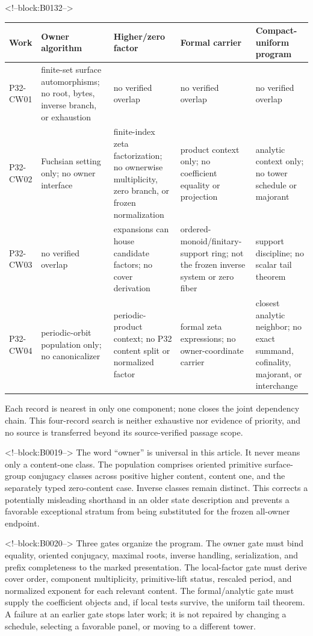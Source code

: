\documentclass[11pt]{article}
\begin{document}
<!--block:B0132-->
\begin{center}
\scriptsize
\begin{tabular}{@{}p{.11\linewidth}p{.19\linewidth}p{.19\linewidth}p{.19\linewidth}p{.19\linewidth}@{}}
\toprule
Work & Owner algorithm & Higher/zero factor & Formal carrier & Compact-uniform program \\
\midrule
P32-CW01 & finite-set surface automorphisms; no root, bytes, inverse branch, or exhaustion & no verified overlap & no verified overlap & no verified overlap \\
P32-CW02 & Fuchsian setting only; no owner interface & finite-index zeta factorization; no ownerwise multiplicity, zero branch, or frozen normalization & product context only; no coefficient equality or projection & analytic context only; no tower schedule or majorant \\
P32-CW03 & no verified overlap & expansions can house candidate factors; no cover derivation & ordered-monoid/finitary-support ring; not the frozen inverse system or zero fiber & support discipline; no scalar tail theorem \\
P32-CW04 & periodic-orbit population only; no canonicalizer & periodic-product context; no P32 content split or normalized factor & formal zeta expressions; no owner-coordinate carrier & closest analytic neighbor; no exact summand, cofinality, majorant, or interchange \\
\bottomrule
\end{tabular}
\end{center}
Each record is nearest in only one component; none closes the joint dependency
chain.  This four-record search is neither exhaustive nor evidence of priority,
and no source is transferred beyond its source-verified passage scope.

<!--block:B0019-->
The word ``owner'' is universal in this article. It never means only a
content-one class. The population comprises oriented primitive
surface-group conjugacy classes across positive higher content, content
one, and the separately typed zero-content case. Inverse classes remain
distinct. This corrects a potentially misleading shorthand in an older
state description and prevents a favorable exceptional stratum from
being substituted for the frozen all-owner endpoint.

<!--block:B0020-->
Three gates organize the program. The owner gate must bind equality,
oriented conjugacy, maximal roots, inverse handling, serialization, and
prefix completeness to the marked presentation. The local-factor gate
must derive cover order, component multiplicity, primitive-lift status,
rescaled period, and normalized exponent for each relevant content. The
formal/analytic gate must supply the coefficient objects and, if local
tests survive, the uniform tail theorem. A failure at an earlier gate
stops later work; it is not repaired by changing a schedule, selecting a
favorable panel, or moving to a different tower.
\end{document}
